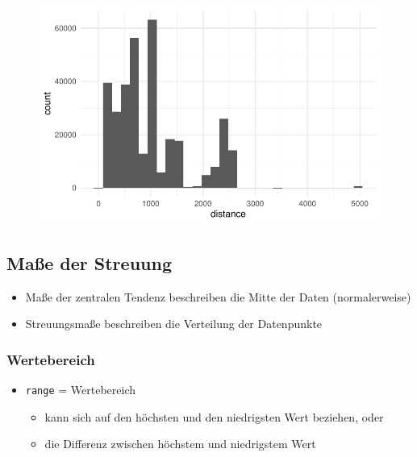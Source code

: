 \documentclass[
  letterpaper,
  DIV=11]{scrartcl}
\providecommand{\tightlist}{%
  \setlength{\itemsep}{0pt}\setlength{\parskip}{0pt}}\usepackage{longtable,booktabs,array}
\begin{document}
\begin{figure}[H]

{\centering \includegraphics{_descr_stats_DE_files/figure-pdf/unnamed-chunk-27-1.pdf}

}

\end{figure}

\hypertarget{mauxdfe-der-streuung}{%
\subsection{Maße der Streuung}\label{mauxdfe-der-streuung}}

\begin{itemize}
\tightlist
\item
  Maße der zentralen Tendenz beschreiben die Mitte der Daten
  (normalerweise)
\item
  Streuungsmaße beschreiben die Verteilung der Datenpunkte
\end{itemize}

\hypertarget{wertebereich}{%
\subsubsection{Wertebereich}\label{wertebereich}}

\begin{itemize}
\tightlist
\item
  \texttt{range} = Wertebereich

  \begin{itemize}
  \tightlist
  \item
    kann sich auf den höchsten und den niedrigsten Wert beziehen, oder
  \item
    die Differenz zwischen höchstem und niedrigstem Wert
  \end{itemize}
\end{itemize}
\end{document}
